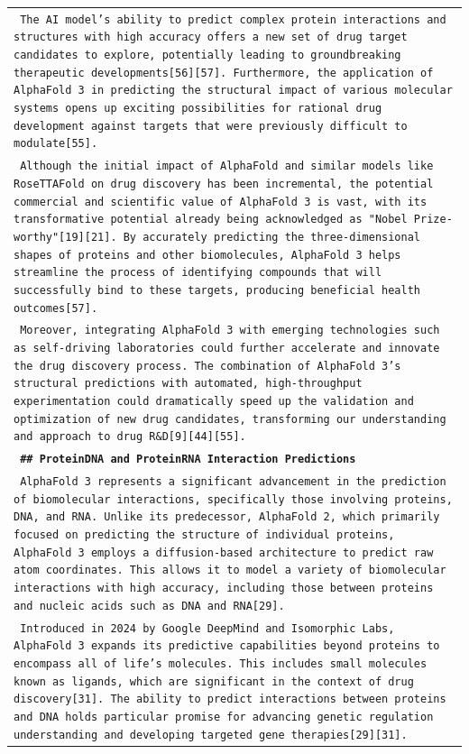 \documentclass[11pt]{article}
\begin{document}
\begin{longtable}{p{\textwidth}}
\texttt{\small{ The AI model's ability to predict complex protein interactions and structures with high accuracy offers a new set of drug target candidates to explore, potentially leading to groundbreaking therapeutic developments[56][57]. Furthermore, the application of AlphaFold 3 in predicting the structural impact of various molecular systems opens up exciting possibilities for rational drug development against targets that were previously difficult to modulate[55]. }} \\
\texttt{\small{ Although the initial impact of AlphaFold and similar models like RoseTTAFold on drug discovery has been incremental, the potential commercial and scientific value of AlphaFold 3 is vast, with its transformative potential already being acknowledged as "Nobel Prize-worthy"[19][21]. By accurately predicting the three-dimensional shapes of proteins and other biomolecules, AlphaFold 3 helps streamline the process of identifying compounds that will successfully bind to these targets, producing beneficial health outcomes[57]. }} \\
\texttt{\small{ Moreover, integrating AlphaFold 3 with emerging technologies such as self-driving laboratories could further accelerate and innovate the drug discovery process. The combination of AlphaFold 3's structural predictions with automated, high-throughput experimentation could dramatically speed up the validation and optimization of new drug candidates, transforming our understanding and approach to drug R\&D[9][44][55]. }} \\
\vspace{1pt}
\texttt{\small{\textbf{ \#\# ProteinDNA and ProteinRNA Interaction Predictions }}} \\
\texttt{\small{ AlphaFold 3 represents a significant advancement in the prediction of biomolecular interactions, specifically those involving proteins, DNA, and RNA. Unlike its predecessor, AlphaFold 2, which primarily focused on predicting the structure of individual proteins, AlphaFold 3 employs a diffusion-based architecture to predict raw atom coordinates. This allows it to model a variety of biomolecular interactions with high accuracy, including those between proteins and nucleic acids such as DNA and RNA[29]. }} \\
\texttt{\small{ Introduced in 2024 by Google DeepMind and Isomorphic Labs, AlphaFold 3 expands its predictive capabilities beyond proteins to encompass all of life's molecules. This includes small molecules known as ligands, which are significant in the context of drug discovery[31]. The ability to predict interactions between proteins and DNA holds particular promise for advancing genetic regulation understanding and developing targeted gene therapies[29][31]. }} \\

\end{longtable}
\end{document}

